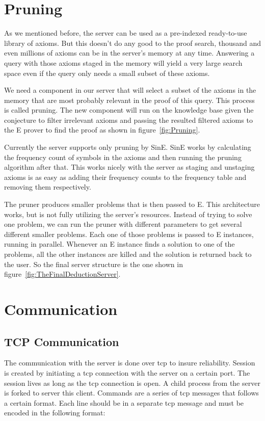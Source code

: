 \section{Pruning}
As we mentioned before, the server can be used as a pre-indexed ready-to-use library of axioms. But this doesn't do any good to the proof search, thousand and even millions of axioms can be in the server's memory at any time. Answering a query with those axioms staged in the memory will yield a very large search space even if the query only needs a small subset of these axioms.

We need a component in our server that will select a subset of the axioms in the memory that are most probably relevant in the proof of this query. This process is called pruning. The new component will run on the knowledge base given the conjecture to filter irrelevant axioms and passing the resulted filtered axioms to the E prover to find the proof as shown in figure~\ref{fig:Pruning}.


Currently the server supports only pruning by SinE. SinE works by calculating the frequency count of symbols in the axioms and then running the pruning algorithm after that. This works nicely with the server as staging and unstaging axioms is as easy as adding their frequency counts to the frequency table and removing them respectively.

The pruner produces smaller problems that is then passed to E. This architecture works, but is not fully utilizing the server's resources. Instead of trying to solve one problem, we can run the pruner with different parameters to get several different smaller problems. Each one of those problems is passed to E instances, running in parallel. Whenever an E instance finds a solution to one of the problems, all the other instances are killed and the solution is returned back to the user. So the final server structure is the one shown in figure~\ref{fig:TheFinalDeductionServer}.


\section{Communication}
\subsection{TCP Communication}\label{subsec:tcpCommunication}
The communication with the server is done over \ac{tcp} to insure reliability. Session is created by initiating a \ac{tcp} connection with the server on a certain port. The session lives as long as the \ac{tcp} connection is open. A child process from the server is forked to server this client. Commands are a series of \ac{tcp} messages that follows a certain format. Each line should be in a separate \ac{tcp} message and must be encoded in the following format:

